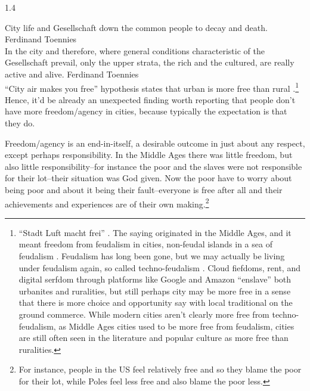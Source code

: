 \documentclass[10pt, letterpaper]{article}
\begin{document}
\begin{spacing}{1.4} %



\noindent City life and Gesellschaft down the common people to decay and death. Ferdinand Toennies\\

\noindent In the city and therefore, where general conditions characteristic of the
Gesellschaft prevail, only the upper strata, the rich and the cultured, are
really active and alive. Ferdinand Toennies\\ %


``City air makes you free'' %
 hypothesis states that urban is more free than rural
 \citep{yamagishi12}.\footnote{``Stadt Luft macht frei'' \citep[p. 12]{park84}. The saying originated in the Middle Ages, and it meant
  freedom from feudalism in cities, non-feudal islands in a sea of feudalism
  \citep{harvey12}. 
Feudalism has long been gone, but we may actually be living under feudalism
again, so called techno-feudalism
\citep{varoufakis24,morozov2022critique}.
{Cloud  fiefdoms, rent, and digital serfdom through platforms like Google and Amazon
  ``enslave'' both urbanites and ruralities, but still perhaps city may be more free
in a sense that there is more choice and opportunity say with local
traditional on the ground commerce.}
%
While %
modern cities aren't clearly more free from techno-feudalism, as Middle Ages cities used to
be more free from feudalism, cities are still often seen in the literature and
popular culture as more free than ruralities.}
%
%
%
 Hence, it'd be already an unexpected finding worth reporting that people don't have more
 freedom/agency in cities, because typically the expectation is that they do.

Freedom/agency is an end-in-itself, a desirable outcome in just about any
respect, except perhaps responsibility. In the Middle Ages there was little freedom, but
also little responsibility--for instance the poor and the slaves were not
responsible for their lot--their situation was God given. Now the poor have to worry about
being poor and about it being their fault--everyone is free after all and their
achievements and experiences are of their own making.\footnote{For instance,
  people in the US feel relatively free and so they blame the poor for their
  lot, while Poles feel less free and also blame the poor less. %
}


\end{spacing}
\end{document}
